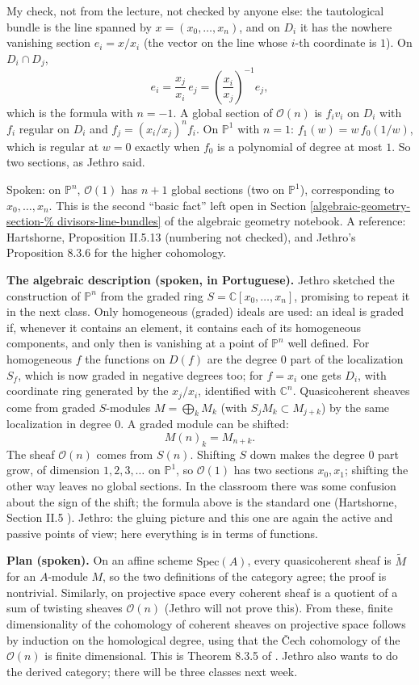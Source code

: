 My check, not from the lecture, not
checked by anyone else: the tautological
bundle is the line spanned by
$x=(x_0,\ldots,x_n)$, and on $D_i$ it has the
nowhere vanishing section $e_i=x/x_i$ (the
vector on the line whose $i$-th coordinate
is $1$). On $D_i\cap D_j$,
$$
e_i=\frac{x_j}{x_i}\,e_j
=\left(\frac{x_i}{x_j}\right)^{-1}e_j,
$$
which is the formula with $n=-1$. A global
section of $\mathcal{O}(n)$ is $f_iv_i$ on
$D_i$ with $f_i$ regular on $D_i$ and
$f_j=(x_i/x_j)^nf_i$. On $\mathbb{P}^1$ with
$n=1$: $f_1(w)=w\,f_0(1/w)$, which is regular
at $w=0$ exactly when $f_0$ is a polynomial
of degree at most $1$. So two sections, as
Jethro said.

Spoken: on $\mathbb{P}^n$, $\mathcal{O}(1)$
has $n+1$ global sections (two on
$\mathbb{P}^1$), corresponding to
$x_0,\ldots,x_n$. This is the second ``basic
fact'' left open in Section
\ref{algebraic-geometry-section-%
divisors-line-bundles}
of the algebraic geometry notebook. A
reference: Hartshorne, Proposition II.5.13
\cite{har} (numbering not checked), and
Jethro's Proposition 8.3.6 for the higher
cohomology.

\medskip\noindent
{\bf The algebraic description (spoken, in
Portuguese).} Jethro sketched the
construction of $\mathbb{P}^n$ from the
graded ring $S=\mathbb{C}[x_0,\ldots,x_n]$,
promising to repeat it in the next class.
Only homogeneous (graded) ideals are used:
an ideal is graded if, whenever it contains
an element, it contains each of its
homogeneous components, and only then is
vanishing at a point of $\mathbb{P}^n$ well
defined. For homogeneous $f$ the functions
on $D(f)$ are the degree $0$ part of the
localization $S_f$, which is now graded in
negative degrees too; for $f=x_i$ one gets
$D_i$, with coordinate ring generated by the
$x_j/x_i$, identified with $\mathbb{C}^n$.
Quasicoherent sheaves come from graded
$S$-modules $M=\bigoplus_k M_k$ (with
$S_jM_k\subset M_{j+k}$) by the same
localization in degree $0$. A graded module
can be shifted:
$$
M(n)_k=M_{n+k}.
$$
The sheaf $\mathcal{O}(n)$ comes from
$S(n)$. Shifting $S$ down makes the degree
$0$ part grow, of dimension $1,2,3,\ldots$
on $\mathbb{P}^1$, so $\mathcal{O}(1)$ has
two sections $x_0,x_1$; shifting the other
way leaves no global sections. In the
classroom there was some confusion about the
sign of the shift; the formula above is the
standard one (Hartshorne, Section II.5
\cite{har}). Jethro: the gluing picture and
this one are again the active and passive
points of view; here everything is in terms
of functions.

\medskip\noindent
{\bf Plan (spoken).} On an affine scheme
$\mathrm{Spec}(A)$, every quasicoherent sheaf
is $\widetilde{M}$ for an $A$-module $M$, so
the two definitions of the category agree;
the proof is nontrivial. Similarly, on
projective space every coherent sheaf is a
quotient of a sum of twisting sheaves
$\mathcal{O}(n)$ (Jethro will not prove
this). From these, finite dimensionality of
the cohomology of coherent sheaves on
projective space follows by induction on the
homological degree, using that the \v{C}ech
cohomology of the $\mathcal{O}(n)$ is finite
dimensional. This is Theorem 8.3.5 of
\cite{vanEkerenHomologicalAlgebra2026}.
Jethro also wants to do the derived
category; there will be three classes next
week.

